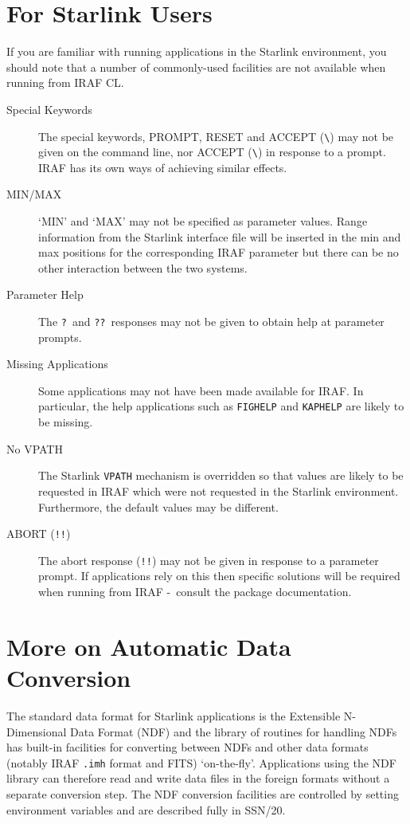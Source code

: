 \documentclass[twoside,11pt]{article}
\newcommand{\xref}[3]{#1}
\newcommand{\xlabel}[1]{}
\newcommand{\dash}{--}
\renewcommand{\dash}{-}
\begin{document}
\section{\xlabel{for_starlink_users}For Starlink Users}
If you are familiar with running applications in the Starlink environment, you
should note that a number of commonly-used facilities are not available when 
running from IRAF CL.
\begin{description}
\item[Special Keywords] The special keywords, PROMPT, RESET and ACCEPT 
(\verb!\!) may not be given on the command line, nor ACCEPT (\verb!\!) in 
response to a prompt.
IRAF has its own ways of achieving similar effects.
\item[MIN/MAX] `MIN' and `MAX' may not be specified as parameter values.
Range information from the Starlink interface file will be inserted in the
min and max positions for the corresponding IRAF parameter but there can be
no other interaction between the two systems.
\item[Parameter Help] The \texttt{?}\ and \texttt{??}\ responses may not be 
given to obtain help at parameter prompts.
\item[Missing Applications] Some applications may not have been made available
for IRAF. In particular, the help applications such as \texttt{FIGHELP} and 
\texttt{KAPHELP} are likely to be missing.
\item[No VPATH] The Starlink \texttt{VPATH} mechanism is overridden so that 
values are likely to be requested in IRAF which were not requested in the 
Starlink environment. Furthermore, the default values may be different.
\item[ABORT ({\texttt{!!}})] The abort response ({\texttt{!!}}) may not be 
given in response to a parameter prompt. 
If applications rely on this then specific solutions will be required when 
running from IRAF \dash\ consult the package documentation.
\end{description}

\section{\xlabel{more_on_automatic_data_conversion}\label{more_on_automatic_data_conversion}More on Automatic Data Conversion}
The standard data format for Starlink applications is the 
\xref{Extensible N-Dimensional Data Format (NDF)}{sun33}{}
and the library of routines for handling NDFs has built-in facilities for
converting between NDFs and other data formats (notably IRAF \texttt{.imh} 
format and FITS) `on-the-fly'. 
Applications using the NDF library can therefore read and write data files in 
the foreign formats without a separate conversion step.
The NDF conversion facilities are controlled by setting environment variables
and are described fully in \xref{SSN/20}{ssn20}{}.
\end{document}
